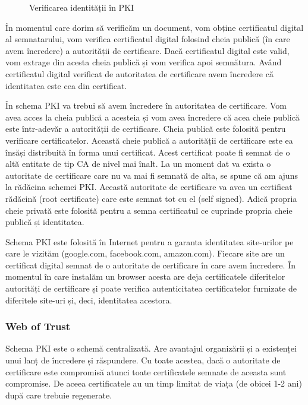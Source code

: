 \begin{figure}[htbp]
  \centering
  \def\svgwidth{\columnwidth}
  
  \caption{Verificarea identității în PKI}
  \label{fig:sec:pki}
\end{figure}

În momentul care dorim să verificăm un document, vom obține certificatul digital al semnatarului, vom verifica certificatul digital folosind cheia publică (în care avem încredere) a autorității de certificare. Dacă certificatul digital este valid, vom extrage din acesta cheia publică și vom verifica apoi semnătura. Având certificatul digital verificat de autoritatea de certificare avem încredere că identitatea este cea din certificat.

În schema PKI va trebui să avem încredere în autoritatea de certificare. Vom avea acces la cheia publică a acesteia și vom avea încredere că acea cheie publică este într-adevăr a autorității de certificare. Cheia publică este folosită pentru verificare certificatelor. Această cheie publică a autorității de certificare este ea însăși distribuită în forma unui certificat. Acest certificat poate fi semnat de o altă entitate de tip CA de nivel mai înalt. La un moment dat va exista o autoritate de certificare care nu va mai fi semnată de alta, se spune că am ajuns la rădăcina schemei PKI. Această autoritate de certificare va avea un certificat rădăcină (root certificate) care este semnat tot cu el (self signed). Adică propria cheie privată este folosită pentru a semna certificatul ce cuprinde propria cheie publică și identitatea.

Schema PKI este folosită în Internet pentru a garanta identitatea site-urilor pe care le vizităm (google.com, facebook.com, amazon.com). Fiecare site are un certificat digital semnat de o autoritate de certificare în care avem încredere. În momentul în care instalăm un browser acesta are deja certificatele diferitelor autorități de certificare și poate verifica autenticitatea certificatelor furnizate de diferitele site-uri și, deci, identitatea acestora.

\subsubsection{Web of Trust}
\label{sec:sec:wot}

Schema PKI este o schemă centralizată. Are avantajul organizării și a existenței unui lanț de încredere și răspundere. Cu toate acestea, dacă o autoritate de certificare este compromisă atunci toate certificatele semnate de aceasta sunt compromise. De aceea certificatele au un timp limitat de viața (de obicei 1-2 ani) după care trebuie regenerate.

